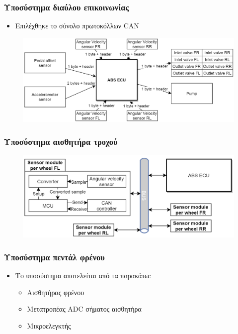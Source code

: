 \documentclass[fleqn]{beamer}
\begin{document}
\begin{frame}
  \frametitle{Υποσύστημα διαύλου επικοινωνίας}
  \begin{itemize}
      \item Επιλέχθηκε το σύνολο πρωτοκόλλων CAN
  \end{itemize}
\begin{figure}[H]
    \begin{center}
    \includegraphics[scale=0.27]{images/inner-communications-v2.png}
    \end{center}
\end{figure}
\end{frame}

\begin{frame}
  \frametitle{Υποσύστημα αισθητήρα τροχού}
\begin{figure}[H]
    \begin{center}
    \includegraphics[scale=0.27]{images/angular-velocity-module-design.png}
    \end{center}
\end{figure}
\end{frame}

\begin{frame}
  \frametitle{Υποσύστημα πεντάλ φρένου}
  \begin{itemize}
      \item Το υποσύστημα αποτελείται από τα παρακάτω:
      \begin{itemize}
        \item Αισθητήρας φρένου
        \item Μετατροπέας ADC σήματος αισθητήρα
        \item Μικροελεγκτής
      \end{itemize}
  \end{itemize}
\end{frame}
\end{document}
